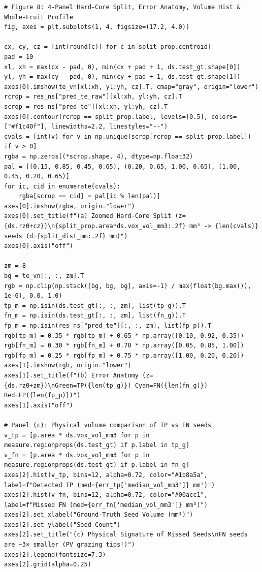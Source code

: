 \documentclass[10pt,a4paper]{article}
\renewcommand{\_}{\origunderscore\allowbreak}
\begin{document}
\begin{codebox}
\begin{lstlisting}[style=pybmed]
# Figure 8: 4-Panel Hard-Core Split, Error Anatomy, Volume Hist & Whole-Fruit Profile
fig, axes = plt.subplots(1, 4, figsize=(17.2, 4.0))

cx, cy, cz = [int(round(c)) for c in split_prop.centroid]
pad = 10
xl, xh = max(cx - pad, 0), min(cx + pad + 1, ds.test_gt.shape[0])
yl, yh = max(cy - pad, 0), min(cy + pad + 1, ds.test_gt.shape[1])
axes[0].imshow(te_vn[xl:xh, yl:yh, cz].T, cmap="gray", origin="lower")
rcrop = res_ns["pred_te_raw"][xl:xh, yl:yh, cz].T
scrop = res_ns["pred_te"][xl:xh, yl:yh, cz].T
axes[0].contour(rcrop == split_prop.label, levels=[0.5], colors=["#f1c40f"], linewidths=2.2, linestyles="--")
cvals = [int(v) for v in np.unique(scrop[rcrop == split_prop.label]) if v > 0]
rgba = np.zeros((*scrop.shape, 4), dtype=np.float32)
pal = [(0.15, 0.85, 0.45, 0.65), (0.20, 0.65, 1.00, 0.65), (1.00, 0.45, 0.20, 0.65)]
for ic, cid in enumerate(cvals):
    rgba[scrop == cid] = pal[ic % len(pal)]
axes[0].imshow(rgba, origin="lower")
axes[0].set_title(f"(a) Zoomed Hard-Core Split (z={ds.rz0+cz})\n{split_prop.area*ds.vox_vol_mm3:.2f} mm³ -> {len(cvals)} seeds (d={split_dist_mm:.2f} mm)")
axes[0].axis("off")

zm = 8
bg = te_vn[:, :, zm].T
rgb = np.clip(np.stack([bg, bg, bg], axis=-1) / max(float(bg.max()), 1e-6), 0.0, 1.0)
tp_m = np.isin(ds.test_gt[:, :, zm], list(tp_g)).T
fn_m = np.isin(ds.test_gt[:, :, zm], list(fn_g)).T
fp_m = np.isin(res_ns["pred_te"][:, :, zm], list(fp_p)).T
rgb[tp_m] = 0.35 * rgb[tp_m] + 0.65 * np.array([0.10, 0.92, 0.35])
rgb[fn_m] = 0.30 * rgb[fn_m] + 0.70 * np.array([0.05, 0.85, 1.00])
rgb[fp_m] = 0.25 * rgb[fp_m] + 0.75 * np.array([1.00, 0.20, 0.20])
axes[1].imshow(rgb, origin="lower")
axes[1].set_title(f"(b) Error Anatomy (z={ds.rz0+zm})\nGreen=TP({len(tp_g)}) Cyan=FN({len(fn_g)}) Red=FP({len(fp_p)})")
axes[1].axis("off")

# Panel (c): Physical volume comparison of TP vs FN seeds
v_tp = [p.area * ds.vox_vol_mm3 for p in measure.regionprops(ds.test_gt) if p.label in tp_g]
v_fn = [p.area * ds.vox_vol_mm3 for p in measure.regionprops(ds.test_gt) if p.label in fn_g]
axes[2].hist(v_tp, bins=12, alpha=0.72, color="#1b8a5a", label=f"Detected TP (med={err_tp['median_vol_mm3']} mm³)")
axes[2].hist(v_fn, bins=12, alpha=0.72, color="#00acc1", label=f"Missed FN (med={err_fn['median_vol_mm3']} mm³)")
axes[2].set_xlabel("Ground-Truth Seed Volume (mm³)")
axes[2].set_ylabel("Seed Count")
axes[2].set_title("(c) Physical Signature of Missed Seeds\nFN seeds are ~3× smaller (PV grazing tips!)")
axes[2].legend(fontsize=7.3)
axes[2].grid(alpha=0.25)


\end{lstlisting}
\end{codebox}
\end{document}

